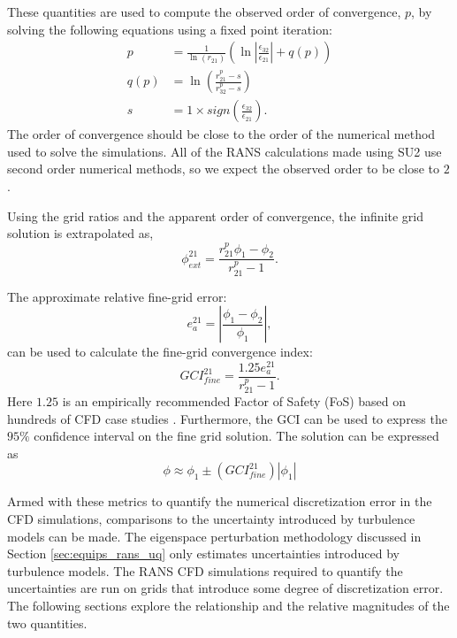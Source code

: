 These quantities are used to compute the observed order of convergence, $p$, by solving the following equations using a fixed point iteration:
\begin{align}
    p & = \frac{1}{\ln{\left ( r_{21} \right )}} \left ( \ln{\left \vert \frac{\epsilon_{32}}{\epsilon_{21}} \right \vert } + q(p) \right )
    \\
    q(p) & = \ln{ \left ( \frac{r_{21}^{p} - s }{r_{32}^{p} - s}\right )}
    \\
    s & = 1\times sign \left ( \frac{\epsilon_{32}}{\epsilon_{21}}\right ).
\end{align}
The order of convergence should be close to the order of the numerical method used to solve the simulations. 
All of the RANS calculations made using SU2 use second order numerical methods, so we expect the observed order to be close to $2$.

Using the grid ratios and the apparent order of convergence, the infinite grid solution is extrapolated as,
\begin{equation}
    \phi_{ext}^{21} = \frac{r_{21}^p\phi_1 - \phi_2}{r_{21}^p - 1}.
\end{equation}

The approximate relative fine-grid error: 
\begin{equation}
    e_a^{21} = \left \vert \frac{\phi_1 - \phi_2}{\phi_1} \right \vert,
\end{equation}
can be used to calculate the fine-grid convergence index:
\begin{equation}
    GCI_{fine}^{21} = \frac{1.25e_a^{21}}{r^p_{21}-1}.
\end{equation}
Here $1.25$ is an empirically recommended Factor of Safety (FoS) based on hundreds of CFD case studies \cite{roache1998verification}.
Furthermore, the GCI can be used to express the $95\%$ confidence interval on the fine grid solution. 
The solution can be expressed as
\begin{equation} \label{equ:num_error_bars}
    \phi \approx \phi_1 \pm \left( GCI_{fine}^{21} \right)\left \vert \phi_1 \right \vert 
\end{equation}

Armed with these metrics to quantify the numerical discretization error in the CFD simulations, comparisons to the uncertainty introduced by turbulence models can be made. 
The eigenspace perturbation methodology discussed in Section \ref{sec:equips_rans_uq} only estimates uncertainties introduced by turbulence models.
The RANS CFD simulations required to quantify the uncertainties are run on grids that introduce some degree of discretization error.
The following sections explore the relationship and the relative magnitudes of the two quantities.


